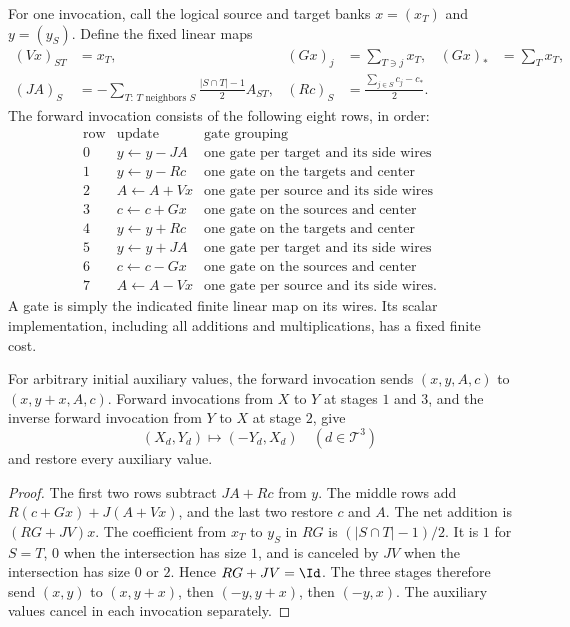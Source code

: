 For one invocation, call the logical source and target banks
$x=(x_T)$ and $y=(y_S)$.  Define the fixed linear maps
\begin{align*}
 (Vx)_{ST}&=x_T,&
 (Gx)_j&=\sum_{T\ni j}x_T,& (Gx)_*&=\sum_Tx_T,\\
 (JA)_S&=-\sum_{T:\,T\text{ neighbors }S}
                  \frac{|S\cap T|-1}{2}A_{ST},&
 (Rc)_S&=\frac{\sum_{j\in S}c_j-c_*}{2}.
\end{align*}
The forward invocation consists of the following eight rows, in order:
\begin{equation}\label{net:schedule}
\begin{array}{c|l|l}
 \text{row}&\text{update}&\text{gate grouping}\\\hline
 0&y\gets y-JA&\text{one gate per target and its side wires}\\
 1&y\gets y-Rc&\text{one gate on the targets and center}\\
 2&A\gets A+Vx&\text{one gate per source and its side wires}\\
 3&c\gets c+Gx&\text{one gate on the sources and center}\\
 4&y\gets y+Rc&\text{one gate on the targets and center}\\
 5&y\gets y+JA&\text{one gate per target and its side wires}\\
 6&c\gets c-Gx&\text{one gate on the sources and center}\\
 7&A\gets A-Vx&\text{one gate per source and its side wires}.
\end{array}
\end{equation}
A gate is simply the indicated finite linear map on its wires.  Its
scalar implementation, including all additions and multiplications,
has a fixed finite cost.

\begin{lemma}\label{net:scalar}
For arbitrary initial auxiliary values, the forward invocation sends
$(x,y,A,c)$ to $(x,y+x,A,c)$.  Forward invocations from $X$ to $Y$
at stages $1$ and $3$, and the inverse forward invocation from $Y$
to $X$ at stage $2$, give
\[
 (X_d,Y_d)\longmapsto(-Y_d,X_d)
 \quad(d\in\mathcal T^3)
\]
and restore every auxiliary value.
\end{lemma}

\begin{proof}
The first two rows subtract $JA+Rc$ from $y$.  The middle rows add
$R(c+Gx)+J(A+Vx)$, and the last two restore $c$ and $A$.  The net
addition is $(RG+JV)x$.  The coefficient from $x_T$ to $y_S$ in
$RG$ is $(|S\cap T|-1)/2$.  It is $1$ for $S=T$, $0$ when the
intersection has size $1$, and is canceled by $JV$ when the
intersection has size $0$ or $2$.  Hence $RG+JV=\Id$.
The three stages therefore send
$(x,y)$ to $(x,y+x)$, then $(-y,y+x)$, then $(-y,x)$.
The auxiliary values cancel in each invocation separately.
\end{proof}

